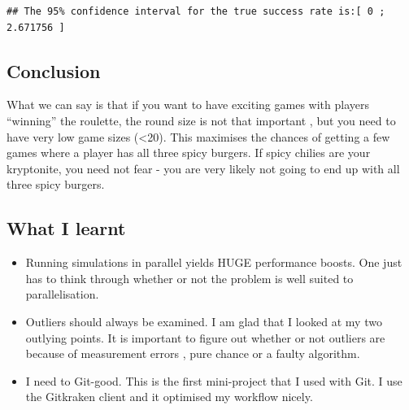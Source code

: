 \documentclass[]{article}
\providecommand{\tightlist}{%
  \setlength{\itemsep}{0pt}\setlength{\parskip}{0pt}}
\begin{document}
\begin{verbatim}
## The 95% confidence interval for the true success rate is:[ 0 ; 2.671756 ]
\end{verbatim}

\subsection{Conclusion}\label{conclusion}

What we can say is that if you want to have exciting games with players
``winning'' the roulette, the round size is not that important , but you
need to have very low game sizes (\textless{}20). This maximises the
chances of getting a few games where a player has all three spicy
burgers. If spicy chilies are your kryptonite, you need not fear - you
are very likely not going to end up with all three spicy burgers.

\subsection{What I learnt}\label{what-i-learnt}

\begin{itemize}
\tightlist
\item
  Running simulations in parallel yields HUGE performance boosts. One
  just has to think through whether or not the problem is well suited to
  parallelisation.
\item
  Outliers should always be examined. I am glad that I looked at my two
  outlying points. It is important to figure out whether or not outliers
  are because of measurement errors , pure chance or a faulty algorithm.
\item
  I need to Git-good. This is the first mini-project that I used with
  Git. I use the Gitkraken client and it optimised my workflow nicely.
\end{itemize}
\end{document}
